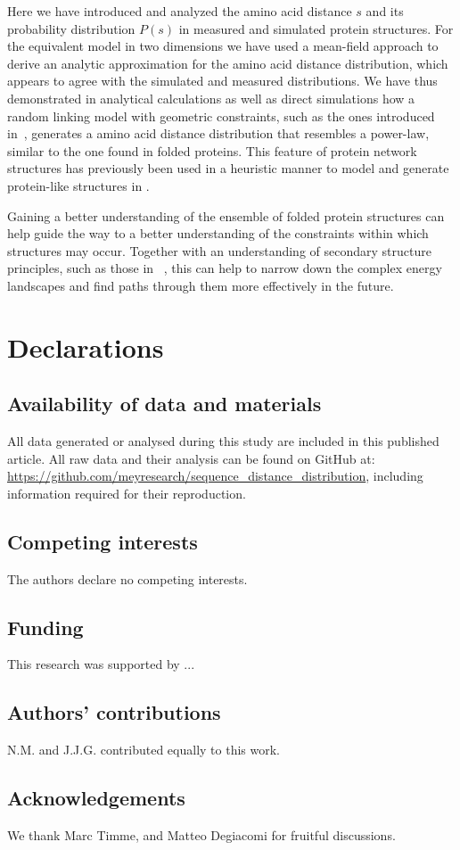 \documentclass[
reprint,
twocolumn,
amsmath,amssymb,superscriptaddress,aps,
pre]{revtex4-1}
\begin{document}
Here we have introduced and analyzed the amino acid distance $s$ and its probability distribution $P(s)$ in measured and simulated protein structures. For the equivalent model in two dimensions we have used a mean-field approach to derive an analytic approximation for the amino acid distance distribution, which appears to agree with the simulated and measured distributions.
We have thus demonstrated in analytical calculations as well as direct simulations how a random linking model with geometric constraints, such as the ones introduced in~\cite{molkenthin2016scaling, molkenthin2020self}, generates a amino acid distance distribution that resembles a power-law, similar to the one found in folded proteins. This feature of protein network structures has previously been used in a heuristic manner to model and generate protein-like structures in \cite{bartoli2008effecta}.

Gaining a better understanding of the ensemble of folded protein structures can help guide the way to a better understanding of the constraints within which structures may occur. Together with an understanding of secondary structure principles, such as those in
~\cite{Danielsson2010, Molkenthin2011}, this can help to narrow down the complex energy landscapes and find paths through them more effectively in the future.

\section*{Declarations}
\subsection{Availability of data and materials}
All data generated or analysed during this study are included in this published article. All raw data and their analysis can be found on GitHub at: \url{https://github.com/meyresearch/sequence_distance_distribution}, including information required for their reproduction. 
\subsection{Competing interests}
The authors declare no competing interests.
\subsection{Funding}
This research was supported by ...
\subsection{Authors' contributions}
N.M. and J.J.G. contributed equally to this work.
\subsection{Acknowledgements}
We thank Marc Timme, and Matteo Degiacomi for fruitful discussions.



\end{document}
